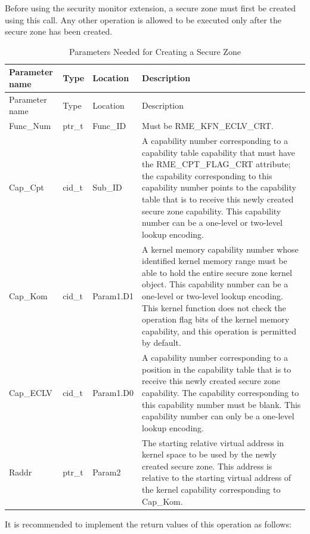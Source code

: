 Before using the security monitor extension, a secure zone must first be created using this call. Any other operation is allowed to be executed only after the secure zone has been created.

\begin{xltabular}{\textwidth}{@{}>{\hsize\raggedright\arraybackslash}X>{\hsize\raggedright\arraybackslash}X>{\hsize\raggedright\arraybackslash}X>{\hsize\raggedright\arraybackslash}X@{}}
\caption{Parameters Needed for Creating a Secure Zone}\label{tab:8-94-create-enclave-parameters}\\
\toprule
Parameter name & Type & Location & Description\tabularnewline
\endfirsthead
\toprule
Parameter name & Type & Location & Description\tabularnewline
\midrule
\endhead
\bottomrule
\endlastfoot
Func\_Num & ptr\_t & Func\_ID &
Must be RME\_KFN\_ECLV\_CRT.\tabularnewline
Cap\_Cpt & cid\_t & Sub\_ID &
A capability number corresponding to a capability table capability that must have the RME\_CPT\_FLAG\_CRT attribute; the capability corresponding to this capability number points to the capability table that is to receive this newly created secure zone capability. This capability number can be a one-level or two-level lookup encoding.\tabularnewline
Cap\_Kom & cid\_t & Param1.D1 &
A kernel memory capability number whose identified kernel memory range must be able to hold the entire secure zone kernel object. This capability number can be a one-level or two-level lookup encoding. This kernel function does not check the operation flag bits of the kernel memory capability, and this operation is permitted by default.\tabularnewline
Cap\_ECLV & cid\_t & Param1.D0 &
A capability number corresponding to a position in the capability table that is to receive this newly created secure zone capability. The capability corresponding to this capability number must be blank. This capability number can only be a one-level lookup encoding.\tabularnewline
Raddr & ptr\_t & Param2 &
The starting relative virtual address in kernel space to be used by the newly created secure zone. This address is relative to the starting virtual address of the kernel capability corresponding to Cap\_Kom.\tabularnewline
\end{xltabular}
\nopagebreak[4]

It is recommended to implement the return values of this operation as follows:

